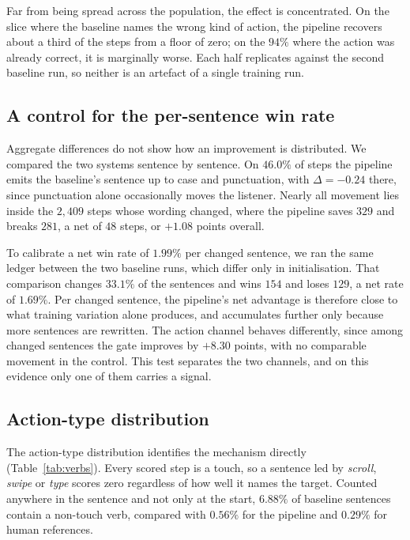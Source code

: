 \documentclass[runningheads,a4paper]{llncs}
\begin{document}
Far from being spread across the population, the effect is concentrated. On the slice where the baseline names the
wrong kind of action, the pipeline recovers about a third of the steps from a floor of zero; on
the $94\%$ where the action was already correct, it is marginally worse. Each half replicates
against the second baseline run, so neither is an artefact of a single training run.

\subsection{A control for the per-sentence win rate}
Aggregate differences do not show how an improvement is distributed. We compared the
two systems sentence by sentence. On $46.0\%$ of steps the pipeline emits the baseline's sentence up to case and punctuation,
with $\Delta = -0.24$ there, since punctuation alone occasionally moves the listener. Nearly all
movement lies inside the $2{,}409$ steps whose
wording changed, where the pipeline saves $329$ and breaks $281$, a net of $48$ steps, or $+1.08$
points overall.

To calibrate a net win rate of $1.99\%$ per changed sentence, we ran the same ledger between the
two baseline runs, which differ only in initialisation. That comparison changes $33.1\%$ of the
sentences and wins $154$ and loses $129$, a net rate of $1.69\%$. Per changed sentence, the
pipeline's net advantage is therefore close to what training variation alone
produces, and accumulates further only because more sentences are rewritten. The action channel
behaves differently, since among changed sentences the gate improves by $+8.30$ points, with no
comparable movement in the control. This test separates the two channels, and on this evidence only
one of them carries a signal.

\subsection{Action-type distribution}
\label{sec:mech}
The action-type distribution identifies the mechanism directly (Table~\ref{tab:verbs}). Every
scored step is a touch, so a sentence led by \emph{scroll}, \emph{swipe} or \emph{type} scores
zero regardless of how well it names the target. Counted anywhere in the sentence and not
only at the start, $6.88\%$ of baseline sentences contain a non-touch verb, compared with $0.56\%$ for
the pipeline and $0.29\%$ for human references.
\end{document}
